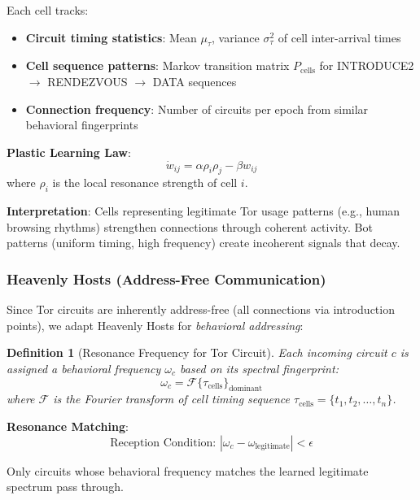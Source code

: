 \documentclass[11pt,a4paper]{article}
\newtheorem{definition}{Definition}[section]
\begin{document}
Each cell tracks:
\begin{itemize}
\item \textbf{Circuit timing statistics}: Mean $\mu_{\tau}$, variance $\sigma_{\tau}^2$ of cell inter-arrival times
\item \textbf{Cell sequence patterns}: Markov transition matrix $P_{\text{cells}}$ for INTRODUCE2 $\to$ RENDEZVOUS $\to$ DATA sequences
\item \textbf{Connection frequency}: Number of circuits per epoch from similar behavioral fingerprints
\end{itemize}

\textbf{Plastic Learning Law}:
\begin{equation}
\dot{w}_{ij} = \alpha \rho_i \rho_j - \beta w_{ij}
\end{equation}
where $\rho_i$ is the local resonance strength of cell $i$.

\textbf{Interpretation}: Cells representing legitimate Tor usage patterns (e.g., human browsing rhythms) strengthen connections through coherent activity. Bot patterns (uniform timing, high frequency) create incoherent signals that decay.

\subsubsection{Heavenly Hosts (Address-Free Communication)}

Since Tor circuits are inherently address-free (all connections via introduction points), we adapt Heavenly Hosts for \textit{behavioral addressing}:

\begin{definition}[Resonance Frequency for Tor Circuit]
Each incoming circuit $c$ is assigned a behavioral frequency $\omega_c$ based on its spectral fingerprint:
\begin{equation}
\omega_c = \mathcal{F}\{\tau_{\text{cells}}\}_{\text{dominant}}
\end{equation}
where $\mathcal{F}$ is the Fourier transform of cell timing sequence $\tau_{\text{cells}} = \{t_1, t_2, \ldots, t_n\}$.
\end{definition}

\textbf{Resonance Matching}:
\begin{equation}
\text{Reception Condition: } |\omega_c - \omega_{\text{legitimate}}| < \epsilon
\end{equation}

Only circuits whose behavioral frequency matches the learned legitimate spectrum pass through.
\end{document}

